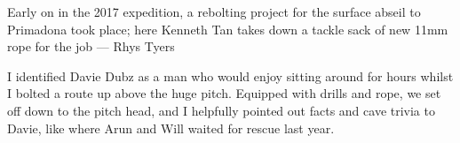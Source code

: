 \begin{marginfigure}
\centering
{}
\caption{Early on in the 2017 expedition, a rebolting project for the surface abseil to Primadona took place; here Kenneth Tan takes down a tackle sack of new 11mm rope for the job --- Rhys Tyers}
\label{teapot}
\end{marginfigure}


I identified Davie Dubz as a man who would enjoy sitting around for hours whilst I bolted a route up above the huge pitch. Equipped with drills and rope, we set off down to the pitch head, and I helpfully pointed out facts and cave trivia to Davie, like where Arun and Will waited for rescue last year.


